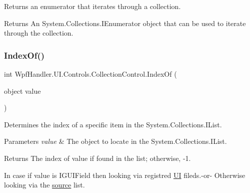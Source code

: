 Returns an enumerator that iterates through a collection. 

\begin{DoxyReturn}{Returns}
An System.\+Collections.\+I\+Enumerator object that can be used to iterate through the collection. 
\end{DoxyReturn}
\mbox{\label{class_wpf_handler_1_1_u_i_1_1_controls_1_1_collection_control_ad2021b989a7f5aae430e12727a918982}} 
\subsubsection{\texorpdfstring{Index\+Of()}{IndexOf()}}
{\footnotesize\ttfamily int Wpf\+Handler.\+U\+I.\+Controls.\+Collection\+Control.\+Index\+Of (\begin{DoxyParamCaption}\item[{object}]{value }\end{DoxyParamCaption})}



Determines the index of a specific item in the System.\+Collections.\+I\+List. 


\begin{DoxyParams}{Parameters}
{\em value} & The object to locate in the System.\+Collections.\+I\+List.\\
\hline
\end{DoxyParams}
\begin{DoxyReturn}{Returns}
The index of value if found in the list; otherwise, -\/1.
\end{DoxyReturn}


In case if value is I\+G\+U\+I\+Field then looking via registred \mbox{\hyperlink{namespace_wpf_handler_1_1_u_i}{UI}} fileds.-\/or-\/ Otherwise looking via the \mbox{\hyperlink{class_wpf_handler_1_1_u_i_1_1_controls_1_1_collection_control_a78ccfdc5208ab2306308d7356757f32f}{source}} list. \mbox{\label{class_wpf_handler_1_1_u_i_1_1_controls_1_1_collection_control_ae89cb3b260d441186bac7ee953f4c028}} 
